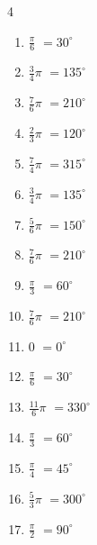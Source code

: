 \begin{multicols}{4}
\begin{enumerate}
  \item $\displaystyle \frac{\pi}{6}$
        $\displaystyle =30^{\circ}$

  \item $\displaystyle \frac{3}{4}\pi$
        $\displaystyle =135^{\circ}$

  \item $\displaystyle \frac{7}{6}\pi$
        $\displaystyle =210^{\circ}$

  \item $\displaystyle \frac{2}{3}\pi$
        $\displaystyle =120^{\circ}$

  \item $\displaystyle \frac{7}{4}\pi$
        $\displaystyle =315^{\circ}$

  \item $\displaystyle \frac{3}{4}\pi$
        $\displaystyle =135^{\circ}$

  \item $\displaystyle \frac{5}{6}\pi$
        $\displaystyle =150^{\circ}$

  \item $\displaystyle \frac{7}{6}\pi$
        $\displaystyle =210^{\circ}$

  \item $\displaystyle \frac{\pi}{3}$
        $\displaystyle =60^{\circ}$

  \item $\displaystyle \frac{7}{6}\pi$
        $\displaystyle =210^{\circ}$

  \item $\displaystyle 0$
        $\displaystyle =0^{\circ}$

  \item $\displaystyle \frac{\pi}{6}$
        $\displaystyle =30^{\circ}$

  \item $\displaystyle \frac{11}{6}\pi$
        $\displaystyle =330^{\circ}$

  \item $\displaystyle \frac{\pi}{3}$
        $\displaystyle =60^{\circ}$

  \item $\displaystyle \frac{\pi}{4}$
        $\displaystyle =45^{\circ}$

  \item $\displaystyle \frac{5}{3}\pi$
        $\displaystyle =300^{\circ}$

  \item $\displaystyle \frac{\pi}{2}$
        $\displaystyle =90^{\circ}$


\end{enumerate}
\end{multicols}

